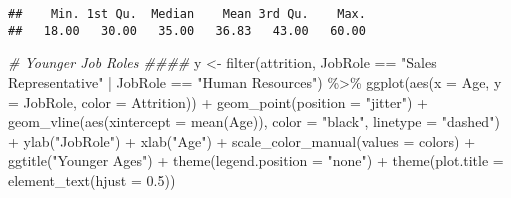 \documentclass[
]{article}
\newenvironment{Shaded}{\begin{snugshade}}{\end{snugshade}}
\newcommand{\AttributeTok}[1]{\textcolor[rgb]{0.77,0.63,0.00}{#1}}
\newcommand{\CommentTok}[1]{\textcolor[rgb]{0.56,0.35,0.01}{\textit{#1}}}
\newcommand{\FloatTok}[1]{\textcolor[rgb]{0.00,0.00,0.81}{#1}}
\newcommand{\FunctionTok}[1]{\textcolor[rgb]{0.00,0.00,0.00}{#1}}
\newcommand{\NormalTok}[1]{#1}
\newcommand{\OtherTok}[1]{\textcolor[rgb]{0.56,0.35,0.01}{#1}}
\newcommand{\SpecialCharTok}[1]{\textcolor[rgb]{0.00,0.00,0.00}{#1}}
\newcommand{\StringTok}[1]{\textcolor[rgb]{0.31,0.60,0.02}{#1}}
\begin{document}
\begin{Shaded}
\end{Shaded}

\begin{verbatim}
##    Min. 1st Qu.  Median    Mean 3rd Qu.    Max. 
##   18.00   30.00   35.00   36.83   43.00   60.00
\end{verbatim}

\begin{Shaded}
\begin{Highlighting}[]
\CommentTok{\# Younger Job Roles \#\#\#\#}
\NormalTok{y }\OtherTok{\textless{}{-}} \FunctionTok{filter}\NormalTok{(attrition, JobRole }\SpecialCharTok{==} \StringTok{"Sales Representative"} \SpecialCharTok{|}\NormalTok{ JobRole }\SpecialCharTok{==} \StringTok{"Human Resources"}\NormalTok{) }\SpecialCharTok{\%\textgreater{}\%}
  \FunctionTok{ggplot}\NormalTok{(}\FunctionTok{aes}\NormalTok{(}\AttributeTok{x =}\NormalTok{ Age, }\AttributeTok{y =}\NormalTok{ JobRole, }\AttributeTok{color =}\NormalTok{ Attrition)) }\SpecialCharTok{+}
  \FunctionTok{geom\_point}\NormalTok{(}\AttributeTok{position =} \StringTok{"jitter"}\NormalTok{) }\SpecialCharTok{+}
  \FunctionTok{geom\_vline}\NormalTok{(}\FunctionTok{aes}\NormalTok{(}\AttributeTok{xintercept =} \FunctionTok{mean}\NormalTok{(Age)), }\AttributeTok{color =} \StringTok{"black"}\NormalTok{, }\AttributeTok{linetype =} \StringTok{"dashed"}\NormalTok{) }\SpecialCharTok{+}
  \FunctionTok{ylab}\NormalTok{(}\StringTok{"JobRole"}\NormalTok{) }\SpecialCharTok{+}
  \FunctionTok{xlab}\NormalTok{(}\StringTok{"Age"}\NormalTok{) }\SpecialCharTok{+}
  \FunctionTok{scale\_color\_manual}\NormalTok{(}\AttributeTok{values =}\NormalTok{ colors) }\SpecialCharTok{+}
  \FunctionTok{ggtitle}\NormalTok{(}\StringTok{"Younger Ages"}\NormalTok{) }\SpecialCharTok{+}
  \FunctionTok{theme}\NormalTok{(}\AttributeTok{legend.position =} \StringTok{"none"}\NormalTok{) }\SpecialCharTok{+}
  \FunctionTok{theme}\NormalTok{(}\AttributeTok{plot.title =} \FunctionTok{element\_text}\NormalTok{(}\AttributeTok{hjust =} \FloatTok{0.5}\NormalTok{)) }
  


\end{Highlighting}
\end{Shaded}
\end{document}
